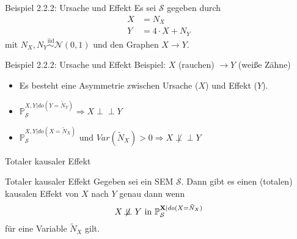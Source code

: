 \begin{frame}[t]{Beispiel 2.2.2: Ursache und Effekt}
    Es sei $\mathcal{S}$ gegeben durch
    \begin{align}
        X &= N_X\\
        Y &= 4 \cdot X + N_Y
    \end{align}
    mit $N_X, N_Y \overset{\text{iid}}{\sim} \mathcal{N}(0, 1)$ und den
    Graphen $X \rightarrow Y$.
\end{frame}

\begin{frame}{Beispiel 2.2.2: Ursache und Effekt}
    Beispiel: $X$ (rauchen) $\rightarrow Y$ (weiße Zähne)
    \begin{itemize}
        \item<2-> Es besteht eine Asymmetrie zwischen Ursache ($X$) und Effekt ($Y$).
        \item<3-> $\mathbb{P}_\mathcal{S}^{X,Y|do(Y=\tilde{N}_Y)} \Rightarrow X \perp\!\!\!\perp Y$
        \item<4-> $\mathbb{P}_\mathcal{S}^{X,Y|do(X=\tilde{N}_X)} \text{ und } Var(\tilde{N}_X) > 0 \Rightarrow X \not\perp\!\!\!\perp Y$
    \end{itemize}
\end{frame}


\begin{frame}{Totaler kausaler Effekt}
    \begin{block}{Totaler kausaler Effekt}
        Gegeben sei ein SEM $\mathcal{S}$. Dann gibt es einen
        (totalen) kausalen Effekt von $X$ nach $Y$ genau dann wenn
        \[X \not\!\perp\!\!\!\perp Y \text{ in } \mathbb{P}_\mathcal{S}^{\mathbf{X}|do(X=\tilde{N}_X)}\]
        für eine Variable $\tilde{N}_X$ gilt.
    \end{block}
\end{frame}

